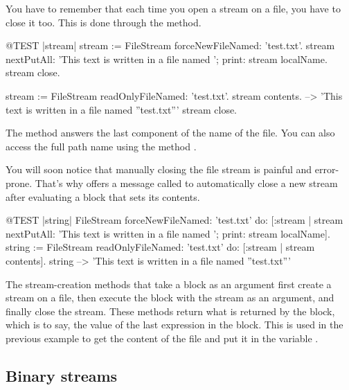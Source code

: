 \documentclass[a4paper,10pt,twoside]{book}
\begin{document}
You have to remember that each time you open a stream on a file, you
have to close it too. This is done through the  method.

\begin{code}{@TEST |stream|}
stream := FileStream forceNewFileNamed: 'test.txt'.
stream
    nextPutAll: 'This text is written in a file named ';
    print: stream localName.
stream close.

stream := FileStream readOnlyFileNamed: 'test.txt'.
stream contents. --> 'This text is written in a file named ''test.txt'''
stream close.
\end{code}



The method  answers the last component of the name of the file. You can
also access the full path name using the method
.

You will soon notice that manually closing the file stream is
painful and error-prone. That's why  offers a message called  to
automatically close a new stream after evaluating a block that
sets its contents.

\begin{code}{@TEST |string|}
FileStream
    forceNewFileNamed: 'test.txt'
    do: [:stream |
        stream
            nextPutAll: 'This text is written in a file named ';
            print: stream localName].
string := FileStream
            readOnlyFileNamed: 'test.txt'
            do: [:stream | stream contents].
string --> 'This text is written in a file named ''test.txt'''
\end{code}

The stream-creation methods that take a block as an argument first
create a stream on a file, then execute the block with the stream
as an argument, and finally close the stream. These methods return what
is returned by the block, which is to say, the value of the last
expression in the block. This is used in the previous example to get
the content of the file and put it in the variable .

\subsection{Binary streams}
\label{sec:binary-streams}
\end{document}
